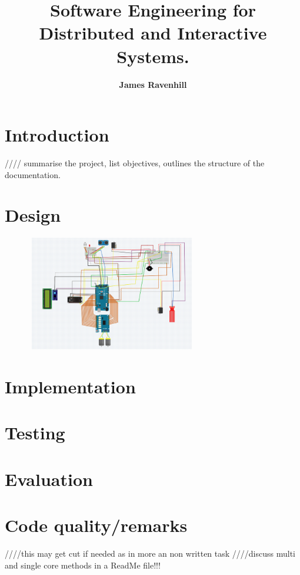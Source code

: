 \documentclass[8pt, a4paper]{article}
\begin{document}
\setlength \topmargin{-1in}
\title{\textbf{Software Engineering for Distributed and Interactive Systems.}}
\author{\textbf{James Ravenhill}}
\date{}
\maketitle

\section{Introduction} 

//// summarise the project, list objectives, outlines the structure of the documentation.


\section{Design}
\begin{figure}[h]
\includegraphics[height=5cm, width=7.5cm]{schematic}
\centering
\end{figure}

\section{Implementation}


\section{Testing}

\section{Evaluation}


\section{Code quality/remarks} ////this may get cut if needed as in more an non written task
////discuss multi and single core methods in a ReadMe file!!!
\end{document}
